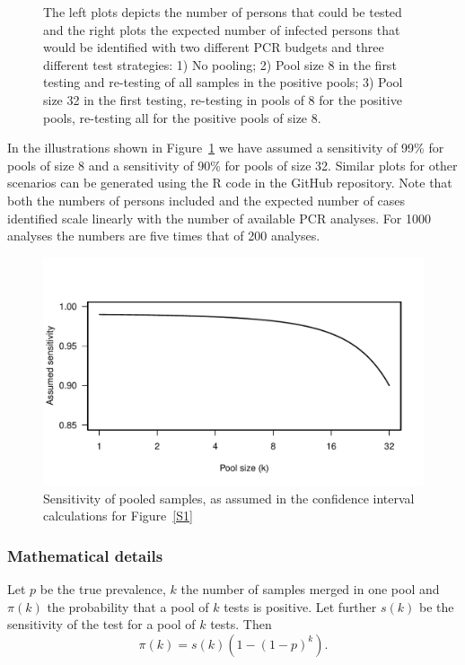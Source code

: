 \documentclass[10pt]{article}
\begin{document}
\begin{figure}[!hbt]
\begin{center}
\end{center}
\caption{The left plots depicts the number of persons that could be tested and the right plots the expected number of infected persons that would be identified with two different PCR budgets and three different test strategies: 1) No pooling; 2) Pool size 8 in the first testing and re-testing of all samples in the positive pools; 3) Pool size 32 in the first testing, re-testing in pools of 8 for the positive pools, re-testing all for the positive pools of size 8.}
\label{S2}
\end{figure}


In the illustrations shown in Figure~\ref{S2}  we have assumed a sensitivity of 99\% for pools of size 8 and a sensitivity of 90\% for pools of size 32.  Similar plots for other scenarios can be generated using the R code in the GitHub repository. Note that both the numbers of persons included and the expected number of cases identified scale linearly with the number of available PCR analyses. For 1000 analyses the numbers are five times that of 200 analyses.

\newpage

\begin{figure}[!hbt]
\begin{center}
\includegraphics[width=0.65\linewidth]{sens_assumed.pdf}
\end{center}
\caption{Sensitivity of pooled samples, as assumed in the confidence interval calculations for Figure~\ref{S1}}
\label{S3}
\end{figure}


\subsubsection*{Mathematical details}

Let $p$ be the true prevalence, $k$ the number of samples merged in one pool and $\pi(k)$ the probability that a pool of $k$ tests is positive. Let further $s(k)$ be the sensitivity of the test for a pool of  $k$ tests. Then
\begin{equation}
\label{pip}
\pi(k)=s(k)(1-(1-p)^k).
\end{equation}
\end{document}
